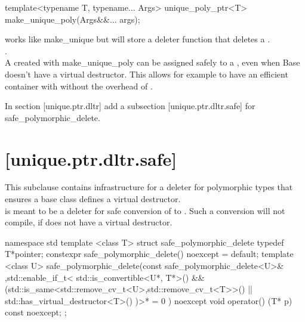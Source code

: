 \documentclass[ebook,11pt,article]{memoir}
\begin{document}
\begin{itemdecl}
template<typename T, typename... Args>
unique_poly_ptr<T> make_unique_poly(Args&&... args);

\end{itemdecl}

\pnum
\effects works like make_unique but will store a deleter function  that deletes a .
\\
\pnum
\returns {}.
\\

\pnum
\enternote
A  created with make_unique_poly can be assigned safely to a , even when Base doesn't have a virtual destructor. This allows for example to have an efficient container with  without the overhead of .
\exitnote


In section [unique.ptr.dltr] add a subsection [unique.ptr.dltr.safe] for safe_polymorphic_delete.
\\

\section{ [unique.ptr.dltr.safe]}
\pnum
This subclause contains infrastructure for a deleter for polymorphic types that ensures a base class defines a virtual destructor.\\

\pnum
\enternote
{} is meant to be a deleter for safe conversion of  to . Such a conversion will not compile, if  does not have a virtual destructor.
\exitnote

\begin{codeblock}
namespace std{
template <class T>
struct  safe_polymorphic_delete
{
	typedef T*pointer;
    constexpr safe_polymorphic_delete() noexcept = default;
    template <class U>
         safe_polymorphic_delete(const safe_polymorphic_delete<U>&
             ,std::enable_if_t<
             	 std::is_convertible<U*, T*>{}() 
             	 && (std::is_same<std::remove_cv_t<U>,std::remove_cv_t<T>>{}()
             	     || std::has_virtual_destructor<T>{}()
            	  )>* = 0
             	  ) noexcept {}
     void operator() (T* p) const noexcept;
};
}
\end{codeblock}
\end{document}
